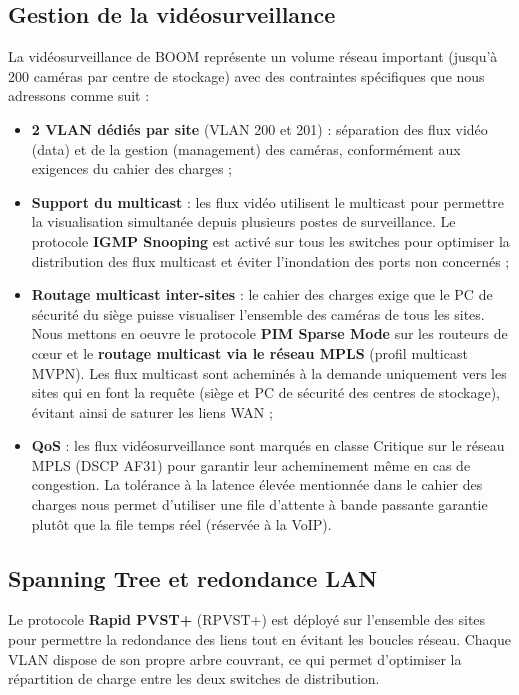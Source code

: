 \documentclass[12pt,a4paper]{report}
\begin{document}
\subsection{Gestion de la vidéosurveillance}

La vidéosurveillance de BOOM représente un volume réseau important (jusqu'à 200 caméras par centre de stockage) avec des contraintes spécifiques que nous adressons comme suit :

\begin{itemize}
\item \textbf{2 VLAN dédiés par site} (VLAN 200 et 201) : séparation des flux vidéo (data) et de la gestion (management) des caméras, conformément aux exigences du cahier des charges ;
\item \textbf{Support du multicast} : les flux vidéo utilisent le multicast pour permettre la visualisation simultanée depuis plusieurs postes de surveillance. Le protocole \textbf{IGMP Snooping} est activé sur tous les switches pour optimiser la distribution des flux multicast et éviter l'inondation des ports non concernés ;
\item \textbf{Routage multicast inter-sites} : le cahier des charges exige que le PC de sécurité du siège puisse visualiser l'ensemble des caméras de tous les sites. Nous mettons en oeuvre le protocole \textbf{PIM Sparse Mode} sur les routeurs de c\oe ur et le \textbf{routage multicast via le réseau MPLS} (profil multicast MVPN). Les flux multicast sont acheminés à la demande uniquement vers les sites qui en font la requête (siège et PC de sécurité des centres de stockage), évitant ainsi de saturer les liens WAN ;
\item \textbf{QoS} : les flux vidéosurveillance sont marqués en classe \og Critique \fg{} sur le réseau MPLS (DSCP AF31) pour garantir leur acheminement même en cas de congestion. La tolérance à la latence élevée mentionnée dans le cahier des charges nous permet d'utiliser une file d'attente à bande passante garantie plutôt que la file temps réel (réservée à la VoIP).
\end{itemize}

\subsection{Spanning Tree et redondance LAN}

Le protocole \textbf{Rapid PVST+} (RPVST+) est déployé sur l'ensemble des sites pour permettre la redondance des liens tout en évitant les boucles réseau. Chaque VLAN dispose de son propre arbre couvrant, ce qui permet d'optimiser la répartition de charge entre les deux switches de distribution.
\end{document}
